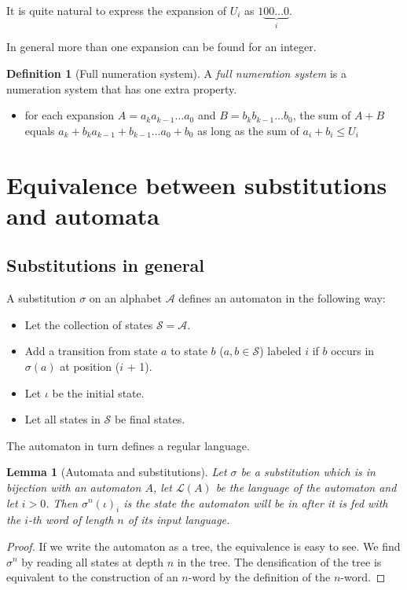 \documentclass{article}
\newtheorem{lemma}[theorem]{Lemma}
\theoremstyle{definition}
\newtheorem{definition}[theorem]{Definition}
\begin{document}
It is quite natural to express the expansion of $U_i$ as
$1\underbrace{00\ldots0}_i$. 

In general more than one expansion can be found for an integer.

\begin{definition}[Full numeration system] \label{def:full_numeration_system}
A \emph{full numeration system} is a numeration system that has one extra
property. 
\begin{itemize}
\item for each expansion $A = a_k a_{k - 1} \ldots a_0$ and 
$B = b_k b_{k - 1} \ldots b_0$, the sum of $A + B$ equals 
$a_k + b_k a_{k - 1} + b_{k - 1} \ldots a_0 + b_0$ as long as the sum of 
$a_i + b_i \le U_i$
\end{itemize}
\end{definition}

\section{Equivalence between substitutions and automata}
\subsection{Substitutions in general}
A substitution $\sigma$ on an alphabet $\mathcal{A}$ defines an automaton in 
the following way:
\begin{itemize}
\item Let the collection of states $\mathcal{S} = \mathcal{A}$.
\item Add a transition from state $a$ to state $b$ ($a,b \in \mathcal{S}$) 
labeled $i$ if $b$ occurs in $\sigma(a)$ at position ($i$ + 1).
\item Let $\iota$ be the initial state.
\item Let all states in $\mathcal{S}$ be final states.
\end{itemize}

The automaton in turn defines a regular language.
\begin{lemma}[Automata and substitutions] \label{lem:automata_substitutions}
Let $\sigma$ be a substitution which is in bijection with an automaton $A$,
let $\mathcal{L}(A)$ be the language of the automaton and let $i > 0$. Then 
$\sigma^n(\iota)_i$ is the state the automaton will be in after it is fed with 
the $i$-th word of length $n$ of its input language.
\end{lemma}

\begin{proof}
If we write the automaton as a tree, the equivalence is easy to see. We find 
$\sigma^n$ by reading all states at depth $n$ in the tree. The densification 
of the tree is equivalent to the construction of an $n$-word by the definition
of the $n$-word.
\end{proof}
\end{document}
